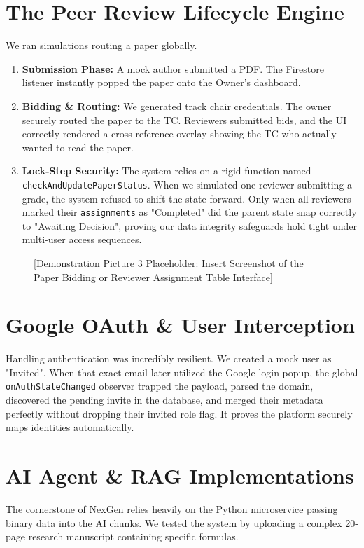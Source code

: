 \documentclass[12pt,a4paper]{report}
\begin{document}
\section{The Peer Review Lifecycle Engine}
We ran simulations routing a paper globally.
\begin{enumerate}
    \item \textbf{Submission Phase:} A mock author submitted a PDF. The Firestore listener instantly popped the paper onto the Owner's dashboard.
    \item \textbf{Bidding & Routing:} We generated track chair credentials. The owner securely routed the paper to the TC. Reviewers submitted bids, and the UI correctly rendered a cross-reference overlay showing the TC who actually wanted to read the paper.
    \item \textbf{Lock-Step Security:} The system relies on a rigid function named \texttt{checkAndUpdatePaperStatus}. When we simulated one reviewer submitting a grade, the system refused to shift the state forward. Only when all reviewers marked their \texttt{assignments} as "Completed" did the parent state snap correctly to "Awaiting Decision", proving our data integrity safeguards hold tight under multi-user access sequences.
\end{enumerate}

\begin{figure}[htbp]
    \centering
    \vspace{5cm}
    \caption{[Demonstration Picture 3 Placeholder: Insert Screenshot of the Paper Bidding or Reviewer Assignment Table Interface]}
    \label{fig:bidding}
\end{figure}

\section{Google OAuth & User Interception}
Handling authentication was incredibly resilient. We created a mock user as "Invited". When that exact email later utilized the Google login popup, the global \texttt{onAuthStateChanged} observer trapped the payload, parsed the domain, discovered the pending invite in the database, and merged their metadata perfectly without dropping their invited role flag. It proves the platform securely maps identities automatically.

\section{AI Agent & RAG Implementations}
The cornerstone of NexGen relies heavily on the Python microservice passing binary data into the AI chunks. We tested the system by uploading a complex 20-page research manuscript containing specific formulas.
\end{document}
